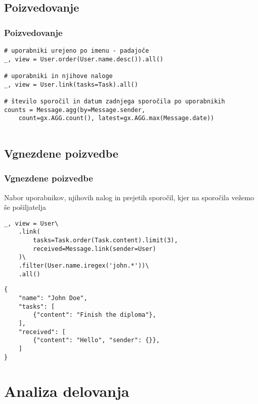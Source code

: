 \documentclass{beamer}
\begin{document}
    \subsection{Poizvedovanje}
    \begin{frame}[fragile]
    \frametitle{Poizvedovanje}
    \footnotesize
    \begin{verbatim}
# uporabniki urejeno po imenu - padajoče
_, view = User.order(User.name.desc()).all()

# uporabniki in njihove naloge
_, view = User.link(tasks=Task).all()

# število sporočil in datum zadnjega sporočila po uporabnikih
counts = Message.agg(by=Message.sender, 
    count=gx.AGG.count(), latest=gx.AGG.max(Message.date))
    
    \end{verbatim}
    \end{frame}

    \subsection{Vgnezdene poizvedbe}
    \begin{frame}[fragile]
    \frametitle{Vgnezdene poizvedbe}
    \begin{block}{
    \footnotesize
    Nabor uporabnikov, njihovih nalog in prejetih sporočil, kjer na sporočila vežemo še pošiljatelja}
    \begin{verbatim}
_, view = User\
    .link(
        tasks=Task.order(Task.content).limit(3),
        received=Message.link(sender=User)
    )\
    .filter(User.name.iregex('john.*'))\
    .all()
        \end{verbatim}
    \end{block}

    \begin{verbatim}
{
    "name": "John Doe",
    "tasks": [
        {"content": "Finish the diploma"},
    ],
    "received": [
        {"content": "Hello", "sender": {}},
    ]
}
\end{verbatim}
    \end{frame}
    
\section{Analiza delovanja}
\end{document}

